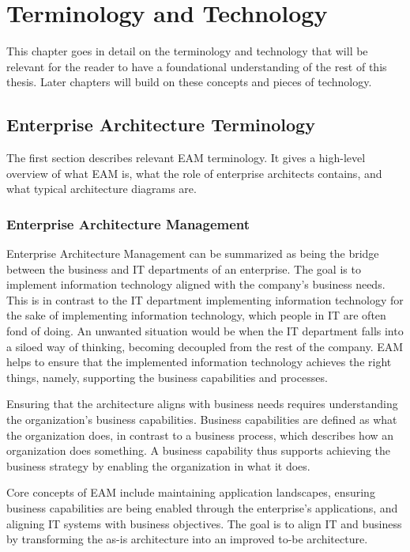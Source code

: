 \chapter{Terminology and Technology}
\label{ch:background}
This chapter goes in detail on the terminology and technology that will be relevant for the reader to have a foundational understanding of the rest of this thesis. Later chapters will build on these concepts and pieces of technology.

\section{Enterprise Architecture Terminology}
\label{sec:background:terminology}
The first section describes relevant EAM terminology. It gives a high-level overview of what EAM is, what the role of enterprise architects contains, and what typical architecture diagrams are.

\subsection{Enterprise Architecture Management}
\label{sub:background:eam}
Enterprise Architecture Management can be summarized as being the bridge between the business and IT departments of an enterprise. The goal is to implement information technology aligned with the company's business needs. This is in contrast to the IT department implementing information technology for the sake of implementing information technology, which people in IT are often fond of doing. \cite{ahmed2017motivating} An unwanted situation would be when the IT department falls into a siloed way of thinking, becoming decoupled from the rest of the company. EAM helps to ensure that the implemented information technology achieves the right things, namely, supporting the business capabilities and processes. \cite[pg.s 2-3]{jung2021masterclass}

Ensuring that the architecture aligns with business needs requires understanding the organization's business capabilities. Business capabilities are defined as what the organization does, in contrast to a business process, which describes how an organization does something. A business capability thus supports achieving the business strategy by enabling the organization in what it does. \cite[pgs. 46-47]{jung2021masterclass}

Core concepts of EAM include maintaining application landscapes, ensuring business capabilities are being enabled through the enterprise's applications, and aligning IT systems with business objectives. The goal is to align IT and business by transforming the as-is architecture into an improved to-be architecture. \cite[pgs. 14-25, 46-50]{jung2021masterclass}

